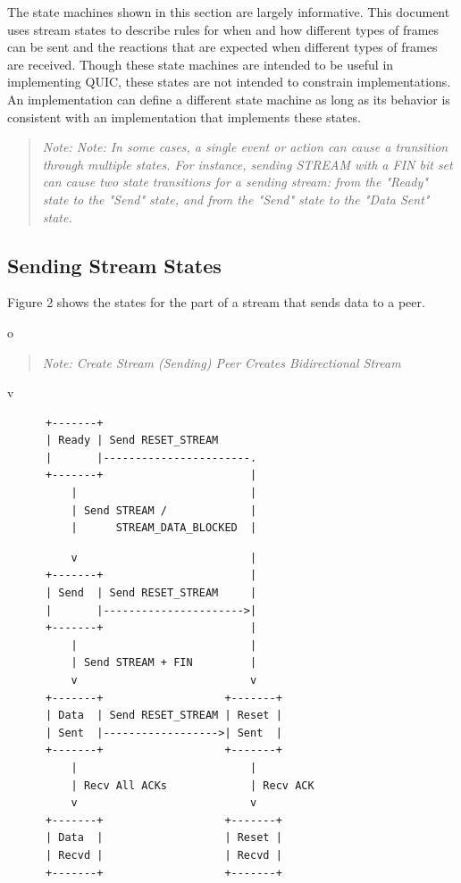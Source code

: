 \documentclass{article}
\begin{document}
The state machines shown in this section are largely informative. This document uses stream states to describe rules for when and how different types of frames can be sent and the reactions that are expected when different types of frames are received.  Though these state machines are intended to be useful in implementing QUIC, these states are not intended to constrain implementations.  An implementation can define a different state machine as long as its behavior is consistent with an implementation that implements these states.

\begin{quote}
\textit{Note: Note: In some cases, a single event or action can cause a transition through multiple states.  For instance, sending STREAM with a FIN bit set can cause two state transitions for a sending stream: from the "Ready" state to the "Send" state, and from the "Send" state to the "Data Sent" state.}
\end{quote}

\subsection{Sending Stream States}

Figure 2 shows the states for the part of a stream that sends data to a peer.

o

\begin{quote}
\textit{Note: Create Stream (Sending) Peer Creates Bidirectional Stream}
\end{quote}

v

\begin{verbatim}
      +-------+
      | Ready | Send RESET_STREAM
      |       |-----------------------.
      +-------+                       |
          |                           |
          | Send STREAM /             |
          |      STREAM_DATA_BLOCKED  |
\end{verbatim}

\begin{verbatim}
          v                           |
      +-------+                       |
      | Send  | Send RESET_STREAM     |
      |       |---------------------->|
      +-------+                       |
          |                           |
          | Send STREAM + FIN         |
          v                           v
      +-------+                   +-------+
      | Data  | Send RESET_STREAM | Reset |
      | Sent  |------------------>| Sent  |
      +-------+                   +-------+
          |                           |
          | Recv All ACKs             | Recv ACK
          v                           v
      +-------+                   +-------+
      | Data  |                   | Reset |
      | Recvd |                   | Recvd |
      +-------+                   +-------+

\end{verbatim}
\end{document}

